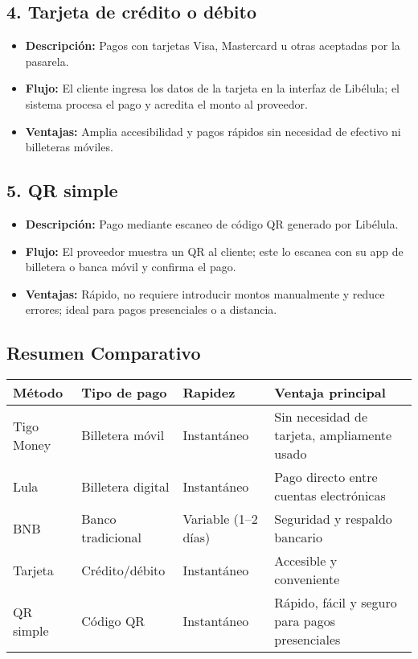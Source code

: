 \documentclass[12pt,a4paper]{article}
\begin{document}
\subsection*{4. Tarjeta de crédito o débito}
\begin{itemize}
	\item \textbf{Descripción:} Pagos con tarjetas Visa, Mastercard u otras aceptadas por la pasarela.
	\item \textbf{Flujo:} El cliente ingresa los datos de la tarjeta en la interfaz de Libélula; el sistema procesa el pago y acredita el monto al proveedor.
	\item \textbf{Ventajas:} Amplia accesibilidad y pagos rápidos sin necesidad de efectivo ni billeteras móviles.
\end{itemize}

\subsection*{5. QR simple}
\begin{itemize}
	\item \textbf{Descripción:} Pago mediante escaneo de código QR generado por Libélula.
	\item \textbf{Flujo:} El proveedor muestra un QR al cliente; este lo escanea con su app de billetera o banca móvil y confirma el pago.
	\item \textbf{Ventajas:} Rápido, no requiere introducir montos manualmente y reduce errores; ideal para pagos presenciales o a distancia.
\end{itemize}

\subsection*{Resumen Comparativo}
\begin{center}
	\begin{tabular}{>{\raggedright}p{3.5cm} p{3cm} p{3cm} p{5cm}}
		\toprule
		\textbf{Método} & \textbf{Tipo de pago} & \textbf{Rapidez} & \textbf{Ventaja principal} \\
		\midrule
		Tigo Money & Billetera móvil & Instantáneo & Sin necesidad de tarjeta, ampliamente usado \\
		Lula & Billetera digital & Instantáneo & Pago directo entre cuentas electrónicas \\
		BNB & Banco tradicional & Variable (1--2 días) & Seguridad y respaldo bancario \\
		Tarjeta & Crédito/débito & Instantáneo & Accesible y conveniente \\
		QR simple & Código QR & Instantáneo & Rápido, fácil y seguro para pagos presenciales \\
		\bottomrule
	\end{tabular}
\end{center}

	
\end{document}
